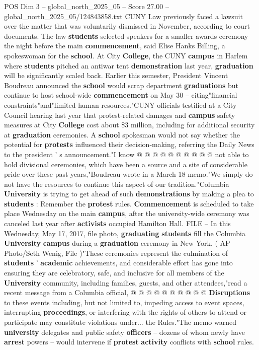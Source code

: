 \begin{textsample}{POS Dim 3 – global\_north\_2025\_05 – Score 27.00 – global\_north\_2025\_05/124843858.txt}
CUNY Law previously faced a lawsuit over the matter that was voluntarily dismissed in November, according to court documents.
The law \textbf{students} selected speakers for a smaller awards ceremony the night before the main \textbf{commencement}, said Elise Hanks Billing, a spokeswoman for the \textbf{school}.
At City \textbf{College}, the CUNY \textbf{campus} in Harlem where \textbf{students} pitched an antiwar tent \textbf{demonstration} last year, \textbf{graduation} will be significantly scaled back.
Earlier this semester, President Vincent Boudreau announced the \textbf{school} would scrap department \textbf{graduations} but continue to host school-wide \textbf{commencement} on May 30 -- citing"financial constraints"and"limited human resources."CUNY officials testified at a City Council hearing last year that protest-related damages and \textbf{campus} safety measures at City \textbf{College} cost about \$3 million, including for additional security at \textbf{graduation} ceremonies.
A \textbf{school} spokesman would not say whether the potential for \textbf{protests} influenced their decision-making, referring the Daily News to the president ' s announcement."I know @ @ @ @ @ @ @ @ @ @ not able to hold divisional ceremonies, which have been a source and a site of considerable pride over these past years,"Boudreau wrote in a March 18 memo."We simply do not have the resources to continue this aspect of our tradition."Columbia \textbf{University} is trying to get ahead of such \textbf{demonstrations} by making a plea to \textbf{students} : Remember the \textbf{protest} rules. \textbf{Commencement} is scheduled to take place Wednesday on the main \textbf{campus}, after the university-wide ceremony was canceled last year after \textbf{activists} occupied Hamilton Hall.
FILE -- In this Wednesday, May 17, 2017, file photo, \textbf{graduating} \textbf{students} fill the Columbia \textbf{University} \textbf{campus} during a \textbf{graduation} ceremony in New York. ( AP Photo/Seth Wenig, File )"These ceremonies represent the culmination of \textbf{students} ' \textbf{academic} achievements, and considerable effort has gone into ensuring they are celebratory, safe, and inclusive for all members of the \textbf{University} community, including families, guests, and other attendees,"read a recent message from a Columbia official, @ @ @ @ @ @ @ @ @ @ \textbf{Disruptions} to these events including, but not limited to, impeding access to event spaces, interrupting \textbf{proceedings}, or interfering with the rights of others to attend or participate may constitute violations under... the Rules."The memo warned \textbf{university} delegates and public safety \textbf{officers} -- dozens of whom newly have \textbf{arrest} powers -- would intervene if \textbf{protest} \textbf{activity} conflicts with \textbf{school} rules.

\end{textsample}
